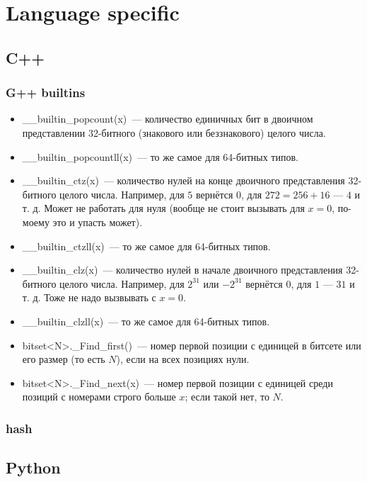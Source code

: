 \section{Language specific}

\subsection{C++}

\subsubsection{G++ builtins}

\begin{itemize}
\item  \_\_builtin\_popcount(x)~--- количество единичных бит в двоичном представлении 32-битного (знакового или беззнакового) целого числа.
\item \_\_builtin\_popcountll(x)~--- то же самое для 64-битных типов.
\item \_\_builtin\_ctz(x)~--- количество нулей на конце двоичного представления 32-битного целого числа. Например, для $5$ вернётся $0$, для $272 = 256 + 16$ --- $4$ и т. д. Может не работать для нуля (вообще не стоит вызывать для $x = 0$, по-моему это и упасть может).
\item \_\_builtin\_ctzll(x)~--- то же самое для 64-битных типов.
\item \_\_builtin\_clz(x)~--- количество нулей в начале двоичного представления 32-битного целого числа. Например, для $2^{31}$ или $-2^{31}$ вернётся
$0$, для $1$ --- $31$ и т. д. Тоже не надо вызвывать с $x = 0$.
\item \_\_builtin\_clzll(x)~--- то же самое для 64-битных типов.

\item bitset<N>.\_Find\_first()~--- номер первой позиции с единицей в битсете или его размер
(то есть $N$), если на всех позициях нули.
\item bitset<N>.\_Find\_next(x)~--- номер первой позиции с единицей среди позиций с номерами строго больше $x$; если такой нет, то $N$.
\end{itemize}

\subsubsection{hash}



\subsection{Python}



